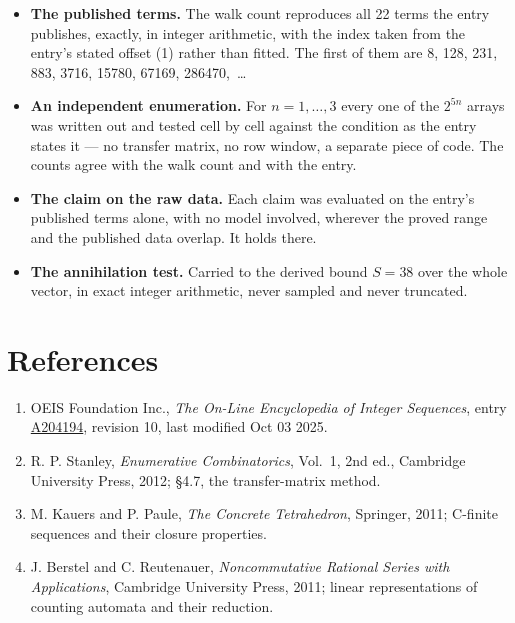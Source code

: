 \documentclass[11pt]{article}
\theoremstyle{definition}
\begin{document}
\begin{itemize}

\item {\bfseries The published terms.} The walk count reproduces all 22 terms the entry publishes, exactly, in integer arithmetic, with the index taken from the entry's stated offset (1) rather than fitted. The first of them are 8, 128, 231, 883, 3716, 15780, 67169, 286470,~\dots

\item {\bfseries An independent enumeration.} For $n = 1,\dots,3$ every one of the $2^{5n}$ arrays was written out and tested cell by cell against the condition as the entry states it --- no transfer matrix, no row window, a separate piece of code. The counts agree with the walk count and with the entry.

\item {\bfseries The claim on the raw data.} Each claim was evaluated on the entry's published terms alone, with no model involved, wherever the proved range and the published data overlap. It holds there.

\item {\bfseries The annihilation test.} Carried to the derived bound $S = 38$ over the whole vector, in exact integer arithmetic, never sampled and never truncated.

\end{itemize}

\section{References}

\begin{enumerate}

\item OEIS Foundation Inc., \emph{The On-Line Encyclopedia of Integer Sequences}, entry \href{https://oeis.org/A204194}{A204194}, revision 10, last modified Oct 03 2025.

\item R. P. Stanley, \emph{Enumerative Combinatorics}, Vol.~1, 2nd ed., Cambridge University Press, 2012; \S4.7, the transfer-matrix method.

\item M. Kauers and P. Paule, \emph{The Concrete Tetrahedron}, Springer, 2011; C-finite sequences and their closure properties.

\item J. Berstel and C. Reutenauer, \emph{Noncommutative Rational Series with Applications}, Cambridge University Press, 2011; linear representations of counting automata and their reduction.

\end{enumerate}
\end{document}
